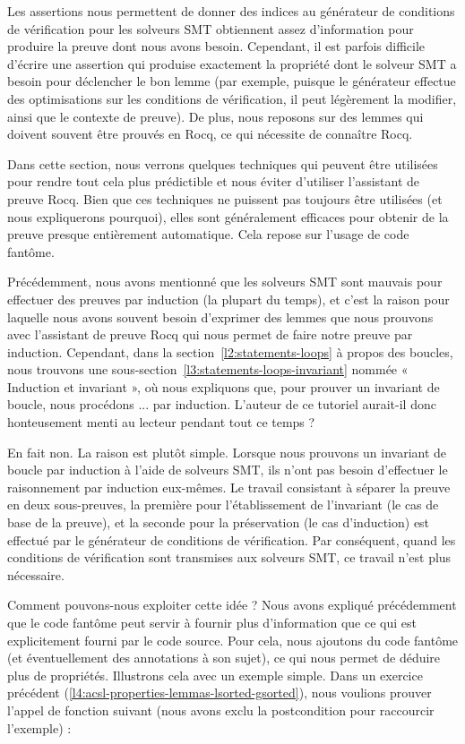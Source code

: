 Les assertions nous permettent de donner des indices au générateur
de conditions de vérification pour les solveurs SMT obtiennent assez d'information
pour produire la preuve dont nous avons besoin. Cependant, il est parfois
difficile d'écrire une assertion qui produise exactement la propriété dont le
solveur SMT a besoin pour déclencher le bon lemme (par exemple, puisque le
générateur effectue des optimisations sur les conditions de vérification, il peut
légèrement la modifier, ainsi que le contexte de preuve). De plus, nous
reposons sur des lemmes qui doivent souvent être prouvés en Rocq, ce qui nécessite
de connaître Rocq.


Dans cette section, nous verrons quelques techniques qui peuvent être
utilisées pour rendre tout cela plus prédictible et nous éviter d'utiliser
l'assistant de preuve Rocq. Bien que ces techniques ne puissent pas toujours
être utilisées (et nous expliquerons pourquoi), elles sont généralement
efficaces pour obtenir de la preuve presque entièrement automatique. Cela
repose sur l'usage de code fantôme.




Précédemment, nous avons mentionné que les solveurs SMT sont mauvais pour
effectuer des preuves par induction (la plupart du temps), et c'est la raison
pour laquelle nous avons souvent besoin d'exprimer des lemmes que nous prouvons
avec l'assistant de preuve Rocq qui nous permet de faire notre preuve par
induction. Cependant, dans la section~\ref{l2:statements-loops} à propos des
boucles, nous trouvons une sous-section~\ref{l3:statements-loops-invariant}
nommée « Induction et invariant », où nous expliquons que, pour prouver un
invariant de boucle, nous procédons ... par induction. L'auteur de ce tutoriel
aurait-il donc honteusement menti au lecteur pendant tout ce temps ?


En fait non. La raison est plutôt simple. Lorsque nous prouvons un
invariant de boucle par induction à l'aide de solveurs SMT, ils n'ont pas
besoin d'effectuer le raisonnement par induction eux-mêmes. Le travail
consistant à séparer la preuve en deux sous-preuves, la première pour
l'établissement de l'invariant (le cas de base de la preuve), et la seconde pour
la préservation (le cas d'induction) est effectué par le générateur
de conditions de vérification. Par conséquent, quand les conditions de vérification sont
transmises aux solveurs SMT, ce travail n'est plus nécessaire.


Comment pouvons-nous exploiter cette idée ? Nous avons expliqué précédemment
que le code fantôme peut servir à fournir plus d'information que ce qui
est explicitement fourni par le code source. Pour cela, nous ajoutons du code
fantôme (et éventuellement des annotations à son sujet), ce qui nous permet
de déduire plus de propriétés. Illustrons cela avec un exemple simple. Dans
un exercice précédent (\ref{l4:acsl-properties-lemmas-lsorted-gsorted}), nous
voulions prouver l'appel de fonction suivant (nous avons exclu la
postcondition pour raccourcir l'exemple) :


